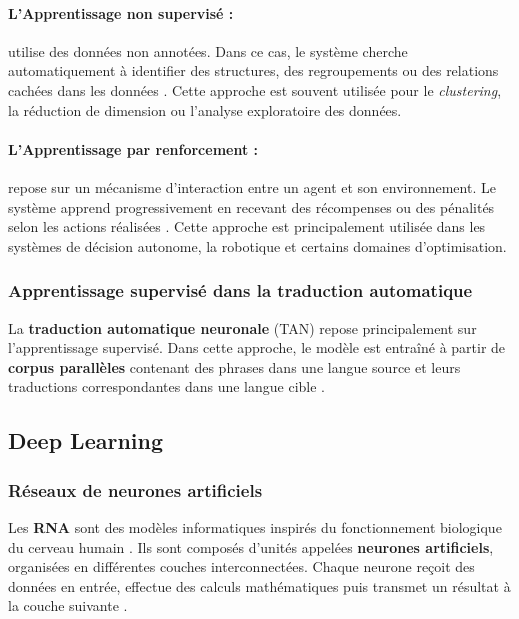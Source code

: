 \paragraph{L'Apprentissage non supervisé :}

utilise des données non annotées. Dans ce cas, le système cherche automatiquement à identifier des structures, des regroupements ou des relations cachées dans les données \cite{Goodfellow-et-al-2016}. Cette approche est souvent utilisée pour le \textit{clustering}, la réduction de dimension ou l'analyse exploratoire des données.

\paragraph{L'Apprentissage par renforcement :}

repose sur un mécanisme d'interaction entre un agent et son environnement. Le système apprend progressivement en recevant des récompenses ou des pénalités selon les actions réalisées \cite{Goodfellow-et-al-2016}. Cette approche est principalement utilisée dans les systèmes de décision autonome, la robotique et certains domaines d'optimisation.

\subsubsection{Apprentissage supervisé dans la traduction automatique}

La \textbf{traduction automatique neuronale} (\ac{TAN}) repose principalement sur l'apprentissage supervisé. Dans cette approche, le modèle est entraîné à partir de \textbf{corpus parallèles} contenant des phrases dans une langue source et leurs traductions correspondantes dans une langue cible \cite{ranathunga2023neural, haulai2023construction, jindal2017building}.

\subsection{Deep Learning}

\subsubsection{Réseaux de neurones artificiels}

Les \textbf{\ac{RNA}} sont des modèles informatiques inspirés du fonctionnement biologique du cerveau humain \cite{Goodfellow-et-al-2016}. Ils sont composés d'unités appelées \textbf{neurones artificiels}, organisées en différentes couches interconnectées. Chaque neurone reçoit des données en entrée, effectue des calculs mathématiques puis transmet un résultat à la couche suivante \cite{Goodfellow-et-al-2016}.

